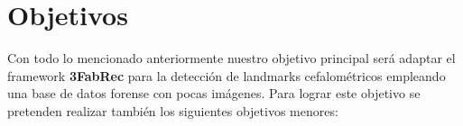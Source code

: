 \section{Objetivos}

\noindent Con todo lo mencionado anteriormente nuestro objetivo principal será adaptar el framework \textbf{3FabRec} \cite{browatzki20203fabrec} para la detección de landmarks cefalométricos empleando una base de datos forense con pocas imágenes. Para lograr este objetivo se pretenden realizar también los siguientes objetivos menores: 


\endinput


